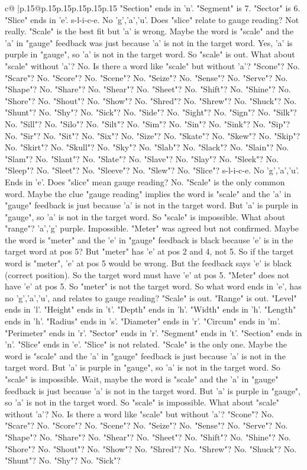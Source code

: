\documentclass{article}
\begin{document}
{\begin{supertabular}{c@{$\;$}|p{.15\linewidth}@{}p{.15\linewidth}p{.15\linewidth}p{.15\linewidth}p{.15\linewidth}p{.15\linewidth}}
{{{"Section" ends in 'n'. "Segment" is 7. "Sector" is 6. "Slice" ends in 'e'. s{-}l{-}i{-}c{-}e. No 'g','a','u'. Does "slice" relate to gauge reading? Not really. "Scale" is the best fit but 'a' is wrong. Maybe the word is "scale" and the 'a' in "gauge" feedback was just because 'a' is not in the target word. Yes, 'a' is purple in "gauge", so 'a' is not in the target word. So "scale" is out. What about "scale" without 'a'? No. Is there a word like "scale" but without 'a'? "Scone"? No. "Scare"? No. "Score"? No. "Scene"? No. "Seize"? No. "Sense"? No. "Serve"? No. "Shape"? No. "Share"? No. "Shear"? No. "Sheet"? No. "Shift"? No. "Shine"? No. "Shore"? No. "Shout"? No. "Show"? No. "Shred"? No. "Shrew"? No. "Shuck"? No. "Shunt"? No. "Shy"? No. "Sick"? No. "Side"? No. "Sight"? No. "Sign"? No. "Silk"? No. "Sill"? No. "Silo"? No. "Silt"? No. "Sim"? No. "Sin"? No. "Sink"? No. "Sip"? No. "Sir"? No. "Sit"? No. "Six"? No. "Size"? No. "Skate"? No. "Skew"? No. "Skip"? No. "Skirt"? No. "Skull"? No. "Sky"? No. "Slab"? No. "Slack"? No. "Slain"? No. "Slam"? No. "Slant"? No. "Slate"? No. "Slave"? No. "Slay"? No. "Sleek"? No. "Sleep"? No. "Sleet"? No. "Sleeve"? No. "Slew"? No. "Slice"? s{-}l{-}i{-}c{-}e. No 'g','a','u'. Ends in 'e'. Does "slice" mean gauge reading? No. "Scale" is the only common word. Maybe the clue "gauge reading" implies the word is "scale" and the 'a' in "gauge" feedback is just because 'a' is not in the target word. But 'a' is purple in "gauge", so 'a' is not in the target word. So "scale" is impossible. What about "range"? 'a','g' purple. Impossible. "Meter" was agreed but not confirmed. Maybe the word is "meter" and the 'e' in "gauge" feedback is black because 'e' is in the target word at pos 5? But "meter" has 'e' at pos 2 and 4, not 5. So if the target word is "meter", 'e' at pos 5 would be wrong. But the feedback says 'e' is black (correct position). So the target word must have 'e' at pos 5. "Meter" does not have 'e' at pos 5. So "meter" is not the target word. So what word ends in 'e', has no 'g','a','u', and relates to gauge reading? "Scale" is out. "Range" is out. "Level" ends in 'l'. "Height" ends in 't'. "Depth" ends in 'h'. "Width" ends in 'h'. "Length" ends in 'h'. "Radius" ends in 's'. "Diameter" ends in 'r'. "Circum" ends in 'm'. "Perimeter" ends in 'r'. "Sector" ends in 'r'. "Segment" ends in 't'. "Section" ends in 'n'. "Slice" ends in 'e'. "Slice" is not related. "Scale" is the only one. Maybe the word is "scale" and the 'a' in "gauge" feedback is just because 'a' is not in the target word. But 'a' is purple in "gauge", so 'a' is not in the target word. So "scale" is impossible. Wait, maybe the word is "scale" and the 'a' in "gauge" feedback is just because 'a' is not in the target word. But 'a' is purple in "gauge", so 'a' is not in the target word. So "scale" is impossible. What about "scale" without 'a'? No. Is there a word like "scale" but without 'a'? "Scone"? No. "Scare"? No. "Score"? No. "Scene"? No. "Seize"? No. "Sense"? No. "Serve"? No. "Shape"? No. "Share"? No. "Shear"? No. "Sheet"? No. "Shift"? No. "Shine"? No. "Shore"? No. "Shout"? No. "Show"? No. "Shred"? No. "Shrew"? No. "Shuck"? No. "Shunt"? No. "Shy"? No. "Sick"? }}}
\end{supertabular}}
\end{document}
